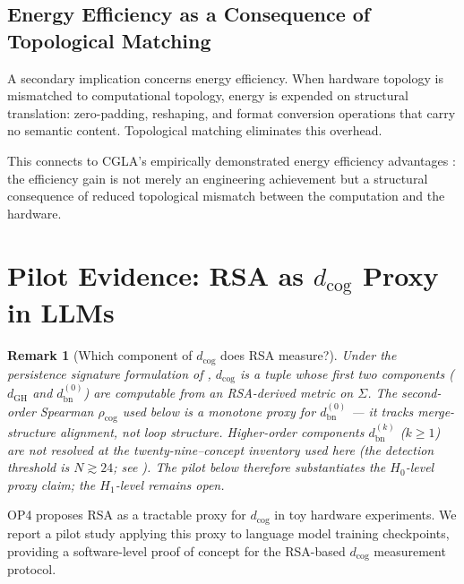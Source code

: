 \documentclass[12pt]{article}
\newtheorem{remark}{Remark}
\begin{document}
\subsection{Energy Efficiency as a Consequence of Topological Matching}

A secondary implication concerns energy efficiency. When hardware topology
is mismatched to computational topology, energy is expended on structural
translation: zero-padding, reshaping, and format conversion operations
that carry no semantic content. Topological matching eliminates this
overhead.

This connects to CGLA's empirically demonstrated energy efficiency
advantages \cite{akabe2025}: the efficiency gain is not merely an
engineering achievement but a structural consequence of reduced topological
mismatch between the computation and the hardware.

\section{Pilot Evidence: RSA as $d_\mathrm{cog}$ Proxy in LLMs}
\label{sec:pilot}

\begin{remark}[Which component of $d_\mathrm{cog}$ does RSA measure?]
Under the persistence signature formulation of
\cite[Def.~\ref{def:dcog-signature}]{minamoto2026topology}, 
$d_\mathrm{cog}$ is a tuple whose first two components 
($d_\mathrm{GH}$ and $d_\mathrm{bn}^{(0)}$) are computable from an 
RSA-derived metric on $\Sigma$. The second-order Spearman 
$\rho_\mathrm{cog}$ used below is a monotone proxy for 
$d_\mathrm{bn}^{(0)}$ --- it tracks merge-structure alignment, not 
loop structure. Higher-order components $d_\mathrm{bn}^{(k)}$ 
($k \geq 1$) are not resolved at the twenty-nine--concept inventory 
used here (the detection threshold is $N \gtrsim 24$; see 
\cite[App.~\ref{app:dcog-h1}]{minamoto2026topology}). The pilot 
below therefore substantiates the $H_0$-level proxy claim; the 
$H_1$-level remains open.
\end{remark}

OP4 proposes RSA as a tractable proxy for $d_\mathrm{cog}$ in toy
hardware experiments.
We report a pilot study applying this proxy to language model
training checkpoints, providing a software-level proof of concept
for the RSA-based $d_\mathrm{cog}$ measurement protocol.
\end{document}
